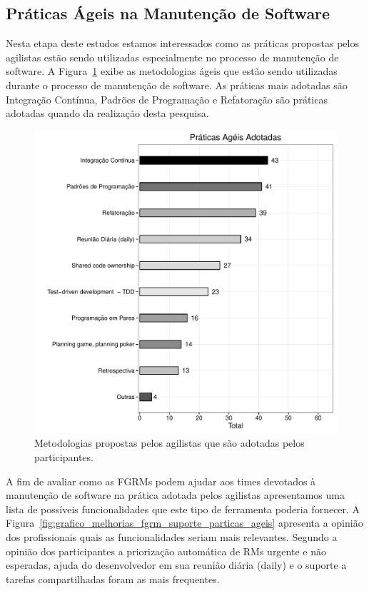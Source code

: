 \subsection{Práticas Ágeis na Manutenção de Software}
\label{sub:práticas_ágeis_na_manutenção_de_software}

Nesta etapa deste estudos estamos interessados como as práticas propostas pelos
agilistas estão sendo utilizadas especialmente no processo de manutenção de
software. A Figura~\ref{fig:grafico_melhorias_fgrm_praticas_ageis_adotadas}
exibe as metodologias ágeis que estão sendo utilizadas durante o processo de
manutenção de software. As práticas mais adotadas são Integração Contínua,
Padrões de Programação e Refatoração são práticas adotadas quando da realização
desta pesquisa. 

\begin{figure}[htpb]
	\centering
	\includegraphics[width=0.8\linewidth]{./chapter-pesquisa-com-profissionais/img/grafico_melhorias_fgrm_praticas_ageis_adotadas.pdf}
	\caption{Metodologias propostas pelos agilistas que são adotadas pelos
		participantes.}
\label{fig:grafico_melhorias_fgrm_praticas_ageis_adotadas}
\end{figure}

A fim de avaliar como as FGRMs podem ajudar aos times devotados à manutenção de
software na prática adotada pelos agilistas apresentamos uma lista de possíveis
funcionalidades que este tipo de ferramenta poderia fornecer. A
Figura~\ref{fig:grafico_melhorias_fgrm_suporte_particas_ageis} apresenta a
opinião dos profissionais quais as funcionalidades seriam mais relevantes.
Segundo a opinião dos participantes a priorização automática de RMs urgente e
não esperadas, ajuda do desenvolvedor em sua reunião diária (daily) e o suporte
a tarefas compartilhadas foram as mais frequentes.

